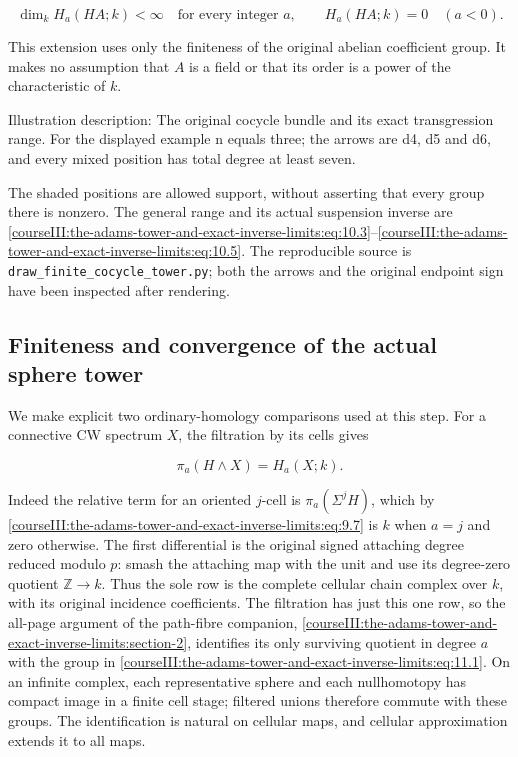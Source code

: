 \begin{equation}
\dim_k H_a(HA;k)<\infty\quad\text{for every integer }a,
       \qquad H_a(HA;k)=0\quad(a<0).
 \label{courseIII:the-adams-tower-and-exact-inverse-limits:eq:10.7}
\end{equation}

This extension uses only the finiteness of the original abelian coefficient group. It makes no assumption that \(A\) is a field or that its order is a power of the characteristic of \(k\).

Illustration description: The original cocycle bundle and its exact transgression range. For the displayed example n equals three; the arrows are d4, d5 and d6, and every mixed position has total degree at least seven.

The shaded positions are allowed support, without asserting that every group there is nonzero. The general range and its actual suspension inverse are \eqref{courseIII:the-adams-tower-and-exact-inverse-limits:eq:10.3}--\eqref{courseIII:the-adams-tower-and-exact-inverse-limits:eq:10.5}. The reproducible source is \texttt{draw\_finite\_cocycle\_tower.py}; both the arrows and the original endpoint sign have been inspected after rendering.

\subsection{Finiteness and convergence of the actual sphere tower}
\label{courseIII:the-adams-tower-and-exact-inverse-limits:adams-actual-convergence}

\label{courseIII:the-adams-tower-and-exact-inverse-limits:section-11}\label{courseIII:adams-tower:11}

We make explicit two ordinary-homology comparisons used at this step. For a connective CW spectrum \(X\), the filtration by its cells gives

\begin{equation}
\pi_a(H\wedge X)=H_a(X;k).
 \label{courseIII:the-adams-tower-and-exact-inverse-limits:eq:11.1}
\end{equation}

Indeed the relative term for an oriented \(j\)-cell is \(\pi_a(\Sigma^j H)\), which by \eqref{courseIII:the-adams-tower-and-exact-inverse-limits:eq:9.7} is \(k\) when \(a=j\) and zero otherwise. The first differential is the original signed attaching degree reduced modulo \(p\): smash the attaching map with the unit and use its degree-zero quotient \(\mathbb Z\to k\). Thus the sole row is the complete cellular chain complex over \(k\), with its original incidence coefficients. The filtration has just this one row, so the all-page argument of the path-fibre companion, \cref{courseIII:the-adams-tower-and-exact-inverse-limits:section-2}, identifies its only surviving quotient in degree \(a\) with the group in \eqref{courseIII:the-adams-tower-and-exact-inverse-limits:eq:11.1}. On an infinite complex, each representative sphere and each nullhomotopy has compact image in a finite cell stage; filtered unions therefore commute with these groups. The identification is natural on cellular maps, and cellular approximation extends it to all maps.

